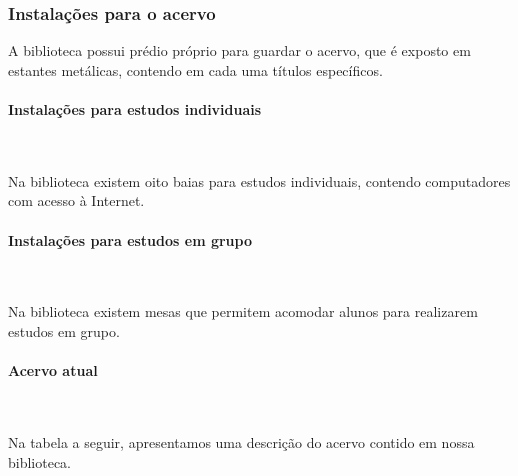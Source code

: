 \subsubsection{Instala\c{c}\~oes para o acervo}


A biblioteca possui prédio próprio para guardar o acervo, que é exposto em estantes metálicas, contendo em cada uma títulos específicos. 


\paragraph{Instalações para estudos individuais}\

Na biblioteca existem oito baias para estudos individuais, contendo computadores com acesso à Internet. 

\paragraph{Instalações para estudos em grupo}\

Na biblioteca existem mesas que permitem acomodar alunos para realizarem estudos em grupo.

\paragraph{Acervo atual}\

Na tabela a seguir, apresentamos uma descrição do acervo contido em nossa biblioteca.

